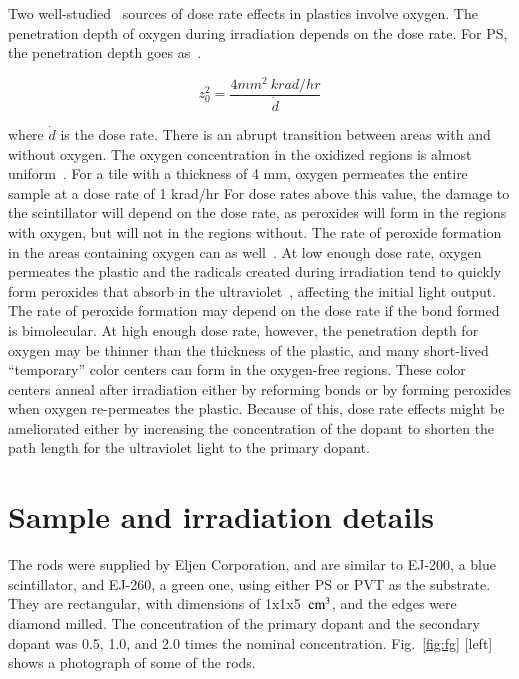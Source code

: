 \documentclass[review]{elsarticle}
\begin{document}
Two well-studied~\cite{clough1,bolland1,bolland2,bateman,cunliffe,Wick1991472,Biagtan1996125}
sources of dose rate effects in plastics
involve oxygen.   The penetration depth of oxygen
during irradiation depends on the dose rate.
For PS, the penetration depth goes as~\cite{Wick1991472,cloughPS}.
\begin{linenomath}
\begin{equation}
z_0^2=\frac{4 mm^2~ krad/hr}{\dot{d}}
\label{eqn:z0}
\end{equation}
\end{linenomath}
where $\dot{d}$ is the dose rate.
There is an abrupt transition between areas with and without oxygen.  The
oxygen  concentration
in the oxidized regions is almost uniform~\cite{cloughPS}.
For a tile with a thickness of 4 mm, oxygen permeates the entire sample at
a dose rate of 1 krad/hr
For dose rates above this value, the damage to the scintillator
will depend on the dose rate, as peroxides will form in the regions
with oxygen, but will not in the regions without.
The rate of peroxide
formation in the areas containing oxygen can as well~\cite{clough1}.
At low enough dose rate, oxygen permeates the plastic 
and the radicals created during irradiation tend to quickly
form peroxides that absorb in the ultraviolet~\cite{clough1}, 
affecting the initial light output.  
The rate of peroxide formation may depend on the dose rate if the bond formed is bimolecular.
At high enough dose rate, however, the penetration depth for oxygen may
be thinner than the thickness of the plastic, and many short-lived ``temporary'' color centers can form in the oxygen-free regions.  
These color centers anneal after irradiation either by reforming bonds or by forming peroxides when oxygen re-permeates the plastic.
Because of this, dose rate effects might be ameliorated either by increasing the concentration of the dopant to shorten the path length for the ultraviolet light to the primary dopant.


\section{Sample and irradiation details}
The rods were supplied by Eljen Corporation, and
are similar to EJ-200, a blue scintillator, and EJ-260, a green one, using either
PS or PVT as the substrate.
They are rectangular, with dimensions of 1x1x5~$\rm{cm^3}$, 
and the edges were diamond milled.
The concentration of the primary dopant and the secondary dopant
was 0.5, 1.0, and 2.0 times the nominal concentration.
Fig.~\ref{fig:fg} [left] shows a photograph of some of the rods.
\end{document}
